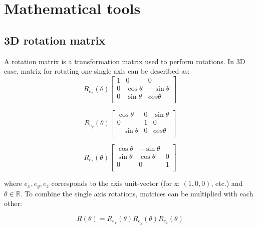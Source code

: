 \chapter{Mathematical tools}

\section{3D rotation matrix}
\label{app:3DrotationMatrix}
A rotation matrix is a transformation matrix used to perform rotations.
In 3D case, matrix for rotating one single axis can be described as:
\begin{equation}
    R_{e_x} (\theta)
    \begin{bmatrix}
        1 & 0 & 0\\
        0 & \cos \theta & - \sin \theta \\
        0 & \sin \theta & cos \theta \\
    \end{bmatrix}
\end{equation}

\begin{equation}
    R_{e_y} (\theta)
    \begin{bmatrix}
        \cos \theta & 0 & \sin \theta\\
        0 & 1 & 0 \\
        - \sin \theta & 0 & cos \theta \\
    \end{bmatrix}
\end{equation}

\begin{equation}
    R_{e_z} (\theta)
    \begin{bmatrix}
        \cos \theta & - \sin \theta\\
        \sin \theta & \cos \theta & 0 \\
        0 & 0 & 1 \\
    \end{bmatrix}
\end{equation}

where $e_x, e_y, e_z$ corresponds to the axis unit-vector (for x: $(1,0,0)$, etc.) and $\theta \in \mathbb{R}$.
To combine the single axis rotations, matrices can be multiplied with each other:

\begin{equation}
    \label{eq:3d-rotation}
    R (\theta) = R_{e_x} (\theta) R_{e_y} (\theta) R_{e_z} (\theta)
\end{equation}

